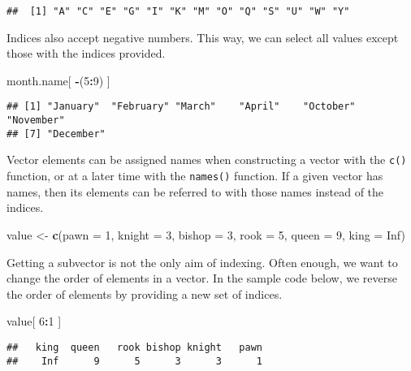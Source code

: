 \documentclass[]{book}
\newenvironment{Shaded}{\begin{snugshade}}{\end{snugshade}}
\newcommand{\KeywordTok}[1]{\textcolor[rgb]{0.13,0.29,0.53}{\textbf{#1}}}
\newcommand{\DataTypeTok}[1]{\textcolor[rgb]{0.13,0.29,0.53}{#1}}
\newcommand{\DecValTok}[1]{\textcolor[rgb]{0.00,0.00,0.81}{#1}}
\newcommand{\StringTok}[1]{\textcolor[rgb]{0.31,0.60,0.02}{#1}}
\newcommand{\OtherTok}[1]{\textcolor[rgb]{0.56,0.35,0.01}{#1}}
\newcommand{\OperatorTok}[1]{\textcolor[rgb]{0.81,0.36,0.00}{\textbf{#1}}}
\newcommand{\NormalTok}[1]{#1}
\theoremstyle{definition}
\theoremstyle{definition}
\theoremstyle{definition}
\theoremstyle{remark}
\begin{document}
\begin{verbatim}
##  [1] "A" "C" "E" "G" "I" "K" "M" "O" "Q" "S" "U" "W" "Y"
\end{verbatim}

Indices also accept negative numbers. This way, we can select all values
except those with the indices provided.

\begin{Shaded}
\begin{Highlighting}[]
\NormalTok{month.name[ }\OperatorTok{-}\NormalTok{(}\DecValTok{5}\OperatorTok{:}\DecValTok{9}\NormalTok{) ]}
\end{Highlighting}
\end{Shaded}

\begin{verbatim}
## [1] "January"  "February" "March"    "April"    "October"  "November"
## [7] "December"
\end{verbatim}

Vector elements can be assigned names when constructing a vector with
the \texttt{c()} function, or at a later time with the \texttt{names()}
function. If a given vector has names, then its elements can be referred
to with those names instead of the indices.

\begin{Shaded}
\begin{Highlighting}[]
\NormalTok{value <-}\StringTok{ }\KeywordTok{c}\NormalTok{(}\DataTypeTok{pawn =} \DecValTok{1}\NormalTok{, }\DataTypeTok{knight =} \DecValTok{3}\NormalTok{, }\DataTypeTok{bishop =} \DecValTok{3}\NormalTok{,}
\DataTypeTok{rook =} \DecValTok{5}\NormalTok{, }\DataTypeTok{queen =} \DecValTok{9}\NormalTok{, }\DataTypeTok{king =} \OtherTok{Inf}\NormalTok{)}
\end{Highlighting}
\end{Shaded}

Getting a subvector is not the only aim of indexing. Often enough, we
want to change the order of elements in a vector. In the sample code
below, we reverse the order of elements by providing a new set of
indices.

\begin{Shaded}
\begin{Highlighting}[]
\NormalTok{value[ }\DecValTok{6}\OperatorTok{:}\DecValTok{1}\NormalTok{ ]}
\end{Highlighting}
\end{Shaded}

\begin{verbatim}
##   king  queen   rook bishop knight   pawn 
##    Inf      9      5      3      3      1
\end{verbatim}
\end{document}
